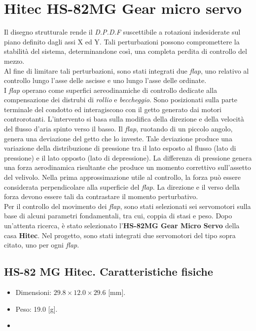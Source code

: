 

\section{Hitec HS-82MG Gear micro servo}
\label{Hitec HS-82MG Gear micro servo}
Il disegno strutturale rende il \textit{D.P.D.F} suscettibile a rotazioni indesiderate sul piano definito dagli assi X ed Y. Tali perturbazioni possono compromettere la stabilità del sistema, determinandone così, una completa perdita di controllo del mezzo.\\
Al fine di limitare tali perturbazioni, sono stati integrati due \textit{flap}, uno relativo al controllo lungo l'asse delle ascisse e uno lungo l'asse delle ordinate.\\
I \textit{flap} operano come superfici aereodinamiche di controllo dedicate alla compensazione dei distrubi di \textit{rollio} e \textit{beccheggio}. Sono posizionati sulla parte terminale del condotto ed interagiscono con il getto generato
dai motori controrotanti. L'intervento si basa sulla modifica della direzione e della velocità del flusso d'aria spinto verso il basso. Il \textit{flap}, ruotando di un piccolo angolo, genera una deviazione del getto che lo investe. Tale deviazione produce una variazione
della distribuzione di pressione tra il lato esposto al flusso (lato di pressione) e il lato opposto (lato di depressione). La differenza di pressione genera una forza aerodinamica risultante che produce un momento correttivo sull'assetto del velivolo.
Nella prima approssimazione utile al controllo, la forza può essere considerata perpendicolare alla superficie del \textit{flap}. La direzione e il verso della forza devono essere tali da contrastare il momento perturbativo.\\
Per il controllo del movimento dei \textit{flap}, sono stati selezionati sei servomotori sulla base di alcuni parametri fondamentali, tra cui, coppia di stasi e peso. Dopo un'attenta ricerca, è stato selezionato l'\textbf{HS-82MG Gear Micro Servo} della casa \textbf{Hitec}.
Nel progetto, sono stati integrati due servomotori del tipo sopra citato, uno per ogni \textit{flap}.

\subsection{HS-82 MG Hitec. Caratteristiche fisiche}
\begin{itemize}
    \item Dimensioni: $29.8\times 12.0\times 29.6$ [mm].
    \item Peso: 19.0 [g].
    \item 
\end{itemize}

